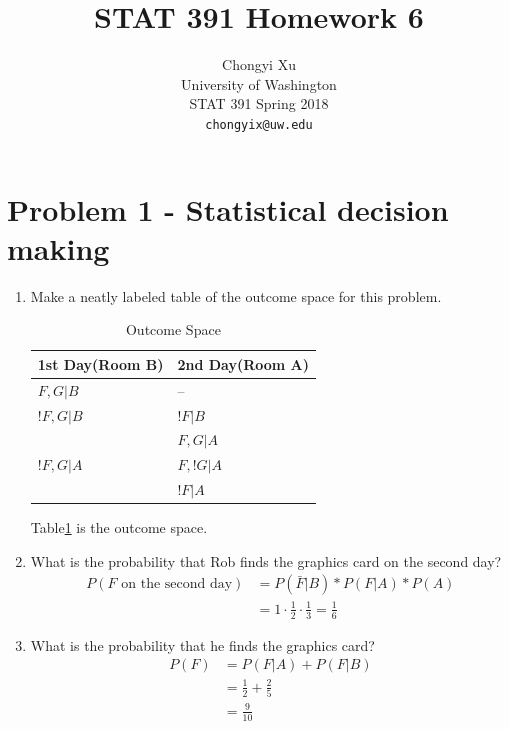 \documentclass[preprint,12pt]{elsarticle}
\begin{document}
    \title{\LARGE \bf
        STAT 391 Homework 6
        }
        
        \author{ \parbox{3 in}{\centering Chongyi Xu \\
                 University of Washington\\
                 STAT 391 Spring 2018\\
                 {\tt\small chongyix@uw.edu}}
        }
    \maketitle

    \section{Problem 1 - Statistical decision making}
    \begin{enumerate}[label=\alph*]
        \item Make a neatly labeled table of the outcome space for
        this problem.
        \begin{table}[h!]
			\centering
			\begin{tabular}{|l|l|}
				\hline
				1st Day(Room B)                        & 2nd Day(Room A)       \\ \hline
				$F,G|B$                          & --            \\ \hline
				$!F,G|B$						& $!F|B$		\\ \hline
				\multirow{3}{*}{$!F,G|A$} & $F,G|A$         \\ \cline{2-2} 
											   & $F,!G|A$ \\ \cline{2-2} 
											   & $!F|A$   \\ \hline
			\end{tabular}
			\caption{Outcome Space}
			\label{table1}
		\end{table}
		Table\ref{table1} is the outcome space.

        \item What is the probability that Rob finds the graphics card
        on the second day?
        \begin{align*}
			P(F\text{ on the second day}) &= P(\bar{F}|B) * P(F|A) * P(A)\\
			&= 1\cdot \frac{1}{2} \cdot \frac{1}{3} = \frac{1}{6}
        \end{align*}

		\item What is the probability that he finds the graphics card?
		\begin{align*}
			P(F) &= P(F|A) + P(F|B) \\
			&= \frac{1}{2} + \frac{2}{5}\\
			&= \frac{9}{10}
		\end{align*}
		

\end{enumerate}
\end{document}
